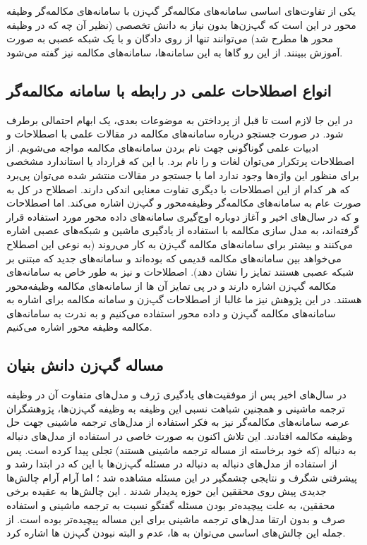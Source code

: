یکی از تفاوت‌های اساسی سامانه‌های مکالمه‌گر گپ‌زن با سامانه‌های مکالمه‌گر وظیفه محور در این است که گپ‌زن‌ها بدون نیاز به دانش تخصصی (نظیر آن چه که در وظیفه محور ها مطرح شد) می‌توانند تنها از روی دادگان و با یک شبکه عصبی به صورت
آموزش ببینند. از این رو گاها به این سامانه‌ها، سامانه‌های مکالمه 
 نیز گفته می‌شود.

	
\subsection{انواع اصطلاحات علمی در رابطه با سامانه مکالمه‌گر}

در این جا لازم است تا قبل از پرداختن به موضوعات بعدی، یک ابهام احتمالی برطرف شود. در صورت جستجو درباره سامانه‌های مکالمه در مقالات علمی با اصطلاحات و ادبیات علمی گوناگونی جهت نام بردن سامانه‌های مکالمه مواجه می‌شویم. از اصطلاحات پرتکرار می‌توان لغات 
و
را نام برد.
با این که قرارداد یا استاندارد مشخصی برای منظور این واژه‌ها وجود ندارد اما با جستجو در مقالات منتشر شده می‌توان پی‌برد که هر کدام از این اصطلاحات با دیگری تفاوت  معنایی اندکی دارند. اصطلاح 
در کل به صورت عام به سامانه‌های مکالمه‌گر وظیفه‌محور و گپ‌زن اشاره می‌کند. 
اما اصطلاحات 
و
که در سال‌های اخیر و آغاز دوباره اوج‌گیری سامانه‌های داده محور مورد استفاده قرار گرفته‌اند، به مدل سازی مکالمه با استفاده از یادگیری ماشین و شبکه‌های عصبی اشاره می‌کنند و بیشتر برای سامانه‌های مکالمه گپ‌زن به کار می‌روند (به نوعی این اصطلاح می‌خواهد بین سامانه‌های مکالمه قدیمی که 
بود‌ه‌اند و سامانه‌های جدید که مبتنی بر شبکه عصبی هستند تمایز را نشان دهد).
اصطلاحات 
و 
نیز به طور خاص به سامانه‌های مکالمه گپ‌زن اشاره دارند و در پی تمایز آن ها از سامانه‌های مکالمه وظیفه‌محور هستند. 
در این پژوهش نیز ما غالبا از اصطلاحات گپ‌زن  و سامانه مکالمه برای اشاره به سامانه‌های مکالمه گپ‌زن و داده محور استفاده می‌کنیم و به ندرت به سامانه‌های مکالمه وظیفه محور اشاره می‌کنیم. 

\subsection{مساله گپ‌زن دانش بنیان}\label{chap1:knowledge_problem}
در سال‌های اخیر پس از موفقیت‌های یادگیری ژرف  و مدل‌های متفاوت آن در وظیفه ترجمه ماشینی و همچنین شباهت نسبی این وظیفه به وظیفه گپ‌زن‌ها، پژوهشگران عرصه سامانه‌های مکالمه‌گر نیز به فکر استفاده از مدل‌های ترجمه ماشینی جهت حل وظیفه مکالمه افتادند. این تلاش اکنون به صورت خاصی در استفاده از مدل‌های دنباله به دنباله (که خود برخاسته از مساله ترجمه ماشینی هستند) تجلی پیدا کرده است. پس از استفاده از مدل‌های دنباله به دنباله در مسئله گپ‌زن‌ها با این که در ابتدا رشد و پیشرفتی شگرف و نتایجی چشمگیر در این مسئله مشاهده شد
؛
اما آرام آرام چالش‌ها جدیدی پیش روی محققین این حوزه پدیدار شدند
\cite{a_neural_conv_model}.
 این چالش‌ها به عقیده برخی محققین، به علت پیچیده‌تر بودن مسئله گفتگو نسبت به ترجمه ماشینی و استفاده صرف و بدون ارتقا مدل‌های ترجمه ماشینی برای این مساله پیچیده‌تر بوده است. از جمله این چالش‌های اساسی می‌توان به 
ها، عدم
 و البته 
نبودن گپ‌زن ها اشاره کرد.

